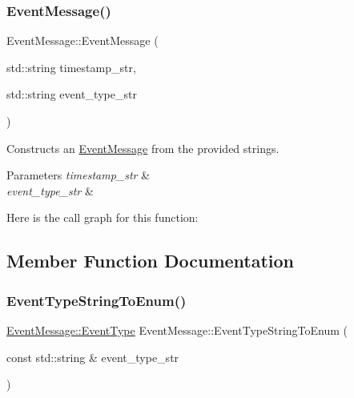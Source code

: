 \subsubsection{\texorpdfstring{Event\+Message()}{EventMessage()}\hspace{0.1cm}{\footnotesize\ttfamily [2/2]}}
{\footnotesize\ttfamily Event\+Message\+::\+Event\+Message (\begin{DoxyParamCaption}\item[{std\+::string}]{timestamp\+\_\+str,  }\item[{std\+::string}]{event\+\_\+type\+\_\+str }\end{DoxyParamCaption})}



Constructs an \mbox{\hyperlink{classEventMessage}{Event\+Message}} from the provided strings. 


\begin{DoxyParams}{Parameters}
{\em timestamp\+\_\+str} & \\
\hline
{\em event\+\_\+type\+\_\+str} & \\
\hline
\end{DoxyParams}
Here is the call graph for this function\+:


\subsection{Member Function Documentation}
\mbox{\label{classEventMessage_aa4656857adf12d74bd0ba9c04e2ee539}} 
\subsubsection{\texorpdfstring{Event\+Type\+String\+To\+Enum()}{EventTypeStringToEnum()}}
{\footnotesize\ttfamily \mbox{\hyperlink{classEventMessage_a262da559aa416f176fdda72e8b5113ab}{Event\+Message\+::\+Event\+Type}} Event\+Message\+::\+Event\+Type\+String\+To\+Enum (\begin{DoxyParamCaption}\item[{const std\+::string \&}]{event\+\_\+type\+\_\+str }\end{DoxyParamCaption})\hspace{0.3cm}{\ttfamily [private]}}



